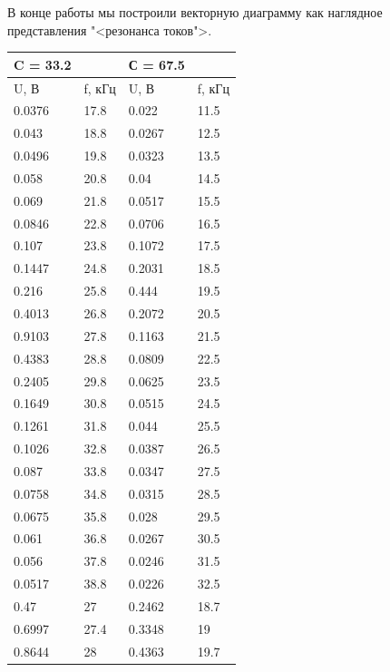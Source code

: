 \documentclass[a4paper, 12pt]{article}
\begin{document}
В конце работы мы построили векторную диаграмму как наглядное представления "<резонанса токов">. 
\newpage
\begin{table}[!ht]
    \centering
    \begin{tabular}{|l|l|l|l|}
    \hline
        C  = 33.2  & ~ & С = 67.5 & ~ \\ \hline
        U, В & f, кГц & U, В & f, кГц \\ \hline
        0.0376 & 17.8 & 0.022 & 11.5 \\ \hline
        0.043 & 18.8 & 0.0267 & 12.5 \\ \hline
        0.0496 & 19.8 & 0.0323 & 13.5 \\ \hline
        0.058 & 20.8 & 0.04 & 14.5 \\ \hline
        0.069 & 21.8 & 0.0517 & 15.5 \\ \hline
        0.0846 & 22.8 & 0.0706 & 16.5 \\ \hline
        0.107 & 23.8 & 0.1072 & 17.5 \\ \hline
        0.1447 & 24.8 & 0.2031 & 18.5 \\ \hline
        0.216 & 25.8 & 0.444 & 19.5 \\ \hline
        0.4013 & 26.8 & 0.2072 & 20.5 \\ \hline
        0.9103 & 27.8 & 0.1163 & 21.5 \\ \hline
        0.4383 & 28.8 & 0.0809 & 22.5 \\ \hline
        0.2405 & 29.8 & 0.0625 & 23.5 \\ \hline
        0.1649 & 30.8 & 0.0515 & 24.5 \\ \hline
        0.1261 & 31.8 & 0.044 & 25.5 \\ \hline
        0.1026 & 32.8 & 0.0387 & 26.5 \\ \hline
        0.087 & 33.8 & 0.0347 & 27.5 \\ \hline
        0.0758 & 34.8 & 0.0315 & 28.5 \\ \hline
        0.0675 & 35.8 & 0.028 & 29.5 \\ \hline
        0.061 & 36.8 & 0.0267 & 30.5 \\ \hline
        0.056 & 37.8 & 0.0246 & 31.5 \\ \hline
        0.0517 & 38.8 & 0.0226 & 32.5 \\ \hline
        0.47 & 27 & 0.2462 & 18.7 \\ \hline
        0.6997 & 27.4 & 0.3348 & 19 \\ \hline
        0.8644 & 28 & 0.4363 & 19.7 \\ \hline
    \end{tabular}
\end{table}
\end{document}
